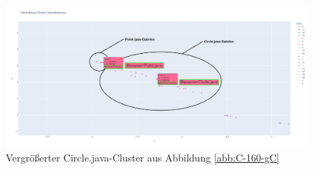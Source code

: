 \begin{figure} %
	\centering
	\includegraphics[width=1.0\textwidth]{images/Clusterung - 160 - gemischte Cluster - zoom.pdf}
	\caption{Vergrößerter Circle.java-Cluster aus Abbildung \ref{abb:C-160-gC}}
	\label{abb:C-160-gC-z}
\end{figure}